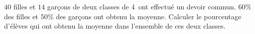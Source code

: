 
$40$ filles et \( 14\) garçons de deux classes de 4\ieme\ ont effectué un devoir commun.  60\% des filles et 50\% des garçons ont obtenu la moyenne. Calculer le pourcentage d'élèves qui ont obtenu la moyenne dans l'ensemble de ces deux classes.

